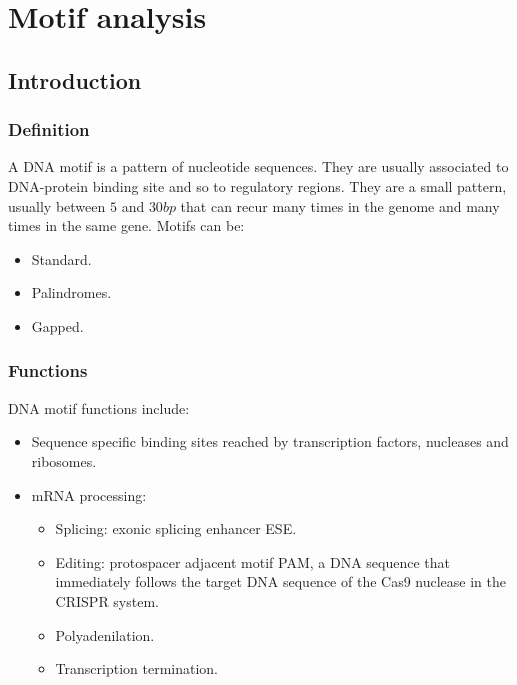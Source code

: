 \graphicspath{{chapters/04/images4/}}
\chapter{Motif analysis}

\section{Introduction}

	\subsection{Definition}
	A DNA motif is a pattern of nucleotide sequences.
	They are usually associated to DNA-protein binding site and so to regulatory regions.
	They are a small pattern, usually between $5$ and $30bp$ that can recur many times in the genome and many times in the same gene.
	Motifs can be:

	\begin{multicols}{3}
		\begin{itemize}
			\item Standard.
			\item Palindromes.
			\item Gapped.
		\end{itemize}
	\end{multicols}

	\subsection{Functions}
	DNA motif functions include:

	\begin{multicols}{2}
		\begin{itemize}
			\item Sequence specific binding sites reached by transcription factors, nucleases and ribosomes.
			\item mRNA processing:

				\begin{itemize}
					\item Splicing: exonic splicing enhancer ESE.
					\item Editing: protospacer adjacent motif PAM, a DNA sequence that immediately follows the target DNA sequence of the Cas9 nuclease in the CRISPR system.
					\item Polyadenilation.
					\item Transcription termination.
				\end{itemize}

		\end{itemize}
	\end{multicols}


